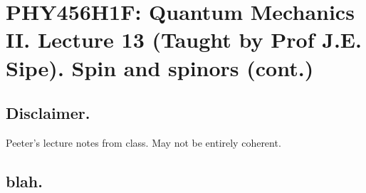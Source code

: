 
%

\chapter{PHY456H1F: Quantum Mechanics II.  Lecture 13 (Taught by Prof J.E. Sipe).  Spin and spinors (cont.)}
\label{chap:qmTwoL13}
{}
\date{Oct 24, 2011}

\beginArtWithToc

\section{Disclaimer.}

Peeter's lecture notes from class.  May not be entirely coherent.

\section{blah.}

\cite{desai2009quantum}

\EndArticle
